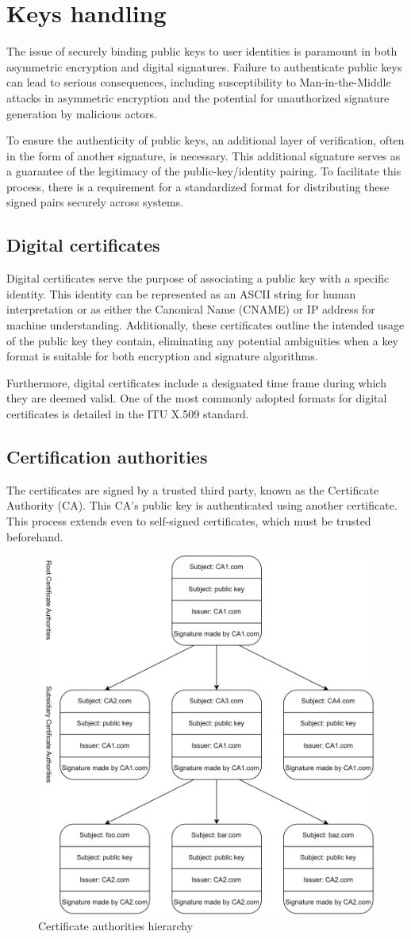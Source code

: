 \section{Keys handling}

The issue of securely binding public keys to user identities is paramount in both asymmetric encryption and digital signatures.
Failure to authenticate public keys can lead to serious consequences, including susceptibility to Man-in-the-Middle attacks in asymmetric encryption and the potential for unauthorized signature generation by malicious actors.

To ensure the authenticity of public keys, an additional layer of verification, often in the form of another signature, is necessary. 
This additional signature serves as a guarantee of the legitimacy of the public-key/identity pairing. 
To facilitate this process, there is a requirement for a standardized format for distributing these signed pairs securely across systems.

\subsection{Digital certificates}
Digital certificates serve the purpose of associating a public key with a specific identity. 
This identity can be represented as an ASCII string for human interpretation or as either the Canonical Name (CNAME) or IP address for machine understanding. 
Additionally, these certificates outline the intended usage of the public key they contain, eliminating any potential ambiguities when a key format is suitable for both encryption and signature algorithms.

Furthermore, digital certificates include a designated time frame during which they are deemed valid. 
One of the most commonly adopted formats for digital certificates is detailed in the ITU X.509 standard.

\subsection{Certification authorities}
The certificates are signed by a trusted third party, known as the Certificate Authority (CA). 
This CA's public key is authenticated using another certificate. 
This process extends even to self-signed certificates, which must be trusted beforehand.
\begin{figure}[H]
    \centering
    \includegraphics[width=0.5\linewidth]{images/ca.png}
    \caption{Certificate authorities hierarchy}
\end{figure}